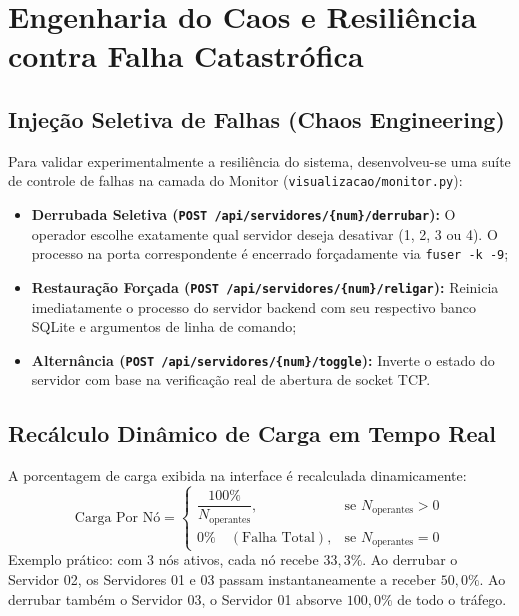 \documentclass[12pt,a4paper]{article}
\begin{document}
\section{Engenharia do Caos e Resiliência contra Falha Catastrófica}

\subsection{Injeção Seletiva de Falhas (Chaos Engineering)}
Para validar experimentalmente a resiliência do sistema, desenvolveu-se uma suíte de controle de falhas na camada do Monitor (\texttt{visualizacao/monitor.py}):
\begin{itemize}
	\item \textbf{Derrubada Seletiva (\texttt{POST /api/servidores/\{num\}/derrubar}):} O operador escolhe exatamente qual servidor deseja desativar (1, 2, 3 ou 4). O processo na porta correspondente é encerrado forçadamente via \texttt{fuser -k -9};
	\item \textbf{Restauração Forçada (\texttt{POST /api/servidores/\{num\}/religar}):} Reinicia imediatamente o processo do servidor backend com seu respectivo banco SQLite e argumentos de linha de comando;
	\item \textbf{Alternância (\texttt{POST /api/servidores/\{num\}/toggle}):} Inverte o estado do servidor com base na verificação real de abertura de socket TCP.
\end{itemize}

\subsection{Recálculo Dinâmico de Carga em Tempo Real}
A porcentagem de carga exibida na interface é recalculada dinamicamente:
\begin{equation}
	\text{Carga Por Nó} = \begin{cases}
		\dfrac{100\%}{N_{\text{operantes}}}, & \text{se } N_{\text{operantes}} > 0 \\[8pt]
		0\% \quad (\text{Falha Total}), & \text{se } N_{\text{operantes}} = 0
	\end{cases}
\end{equation}
Exemplo prático: com 3 nós ativos, cada nó recebe $33{,}3\%$. Ao derrubar o Servidor 02, os Servidores 01 e 03 passam instantaneamente a receber $50{,}0\%$. Ao derrubar também o Servidor 03, o Servidor 01 absorve $100{,}0\%$ de todo o tráfego.
\end{document}
